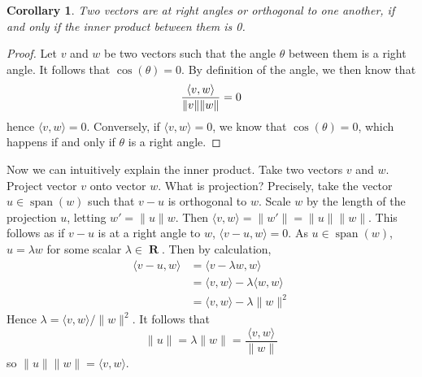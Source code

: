 \documentclass{report}
\newtheorem{corollary}[theorem]{Corollary}
\DeclareMathOperator{\real}{\mathbf{R}}
\DeclareMathOperator{\spn}{span}
\DeclarePairedDelimiter{\inner}{\langle}{\rangle}
\begin{document}
\begin{corollary}
  Two vectors are at right angles or orthogonal to one another, if and only if the inner product between them is 0.
\end{corollary}
\begin{proof}
  Let $v$ and $w$ be two vectors such that the angle $\theta$ between them is a right angle. It follows that $\cos(\theta) = 0$. By definition of the angle, we then know that
  \[ \frac{\inner{v, w}}{\|v\|\|w\|} = 0 \]
  hence $\langle v, w \rangle = 0$. Conversely, if $\langle v, w \rangle = 0$, we know that $\cos(\theta) = 0$, which happens if and only if $\theta$ is a right angle.
\end{proof}

Now we can intuitively explain the inner product. Take two vectors $v$ and $w$. Project vector $v$ onto vector $w$. What is projection? Precisely, take the vector $u \in \spn(w)$ such that $v - u$ is orthogonal to $w$. Scale $w$ by the length of the projection $u$, letting $w' = \|u\| w$. Then $\langle v, w \rangle = \| w' \| = \| u \| \| w \|$. This follows as if $v - u$ is at a right angle to $w$, $\langle v - u, w \rangle = 0$. As $u \in \spn(w)$, $u = \lambda w$ for some scalar $\lambda \in \real$. Then by calculation,
%
\begin{align*}
  \langle v - u, w \rangle &= \langle v - \lambda w, w \rangle\\
                           &= \langle v, w \rangle - \lambda \langle w, w \rangle\\
                           &= \langle v, w \rangle - \lambda \|w\|^2
\end{align*}
%
Hence $\lambda = \langle v, w \rangle/\|w\|^2$. It follows that
%
\[ \|u\| = \lambda \| w \| = \frac{\langle v, w \rangle}{\|w\|} \]
%
so $\|u\|\|w\| = \langle v, w \rangle$.

\begin{center}
\end{center}
\end{document}
